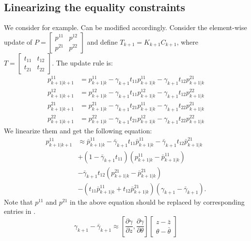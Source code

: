 \documentclass[letterpaper, 10 pt, conference]{ieeeconf}  %
\begin{document}
\subsection{Linearizing the equality constraints}
We consider  for example.  Can be modified accordingly.
Consider the element-wise update of $P=\begin{bmatrix}
p^{11} & p^{12}\\p^{21} & p^{22}
\end{bmatrix}$ and define $T_{k+1}=K_{k+1}C_{k+1}$, where $T=\begin{bmatrix}
t_{11} & t_{12}\\ t_{21} & t_{22}
\end{bmatrix}.$
The update rule is:
\begin{equation}\label{eqn:elementwise-upd-P}
\begin{split}
p^{11}_{k+1|k+1}&=p^{11}_{k+1|k}-\gamma_{k+1}t_{11}p^{11}_{k+1|k}-\gamma_{k+1}t_{12}p^{21}_{k+1|k}\\
p^{12}_{k+1|k+1}&=p^{12}_{k+1|k}-\gamma_{k+1}t_{11}p^{12}_{k+1|k}-\gamma_{k+1}t_{12}p^{22}_{k+1|k}\\
p^{21}_{k+1|k+1}&=p^{21}_{k+1|k}-\gamma_{k+1}t_{21}p^{11}_{k+1|k}-\gamma_{k+1}t_{22}p^{21}_{k+1|k}\\
p^{22}_{k+1|k+1}&=p^{22}_{k+1|k}-\gamma_{k+1}t_{21}p^{12}_{k+1|k}-\gamma_{k+1}t_{22}p^{22}_{k+1|k}
\end{split}
\end{equation}
We linearize them and get the following equation:
\begin{equation*}
\begin{split}
p^{11}_{k+1|k+1}&\approx \bar{p}^{11}_{k+1|k}-\bar{\gamma}_{k+1}t_{11}\bar{p}^{11}_{k+1|k}-\bar{\gamma}_{k+1}t_{12}\bar{p}^{21}_{k+1|k}\\
&+(1-\bar{\gamma}_{k+1}t_{11})(p^{11}_{k+1|k}-\bar{p}^{11}_{k+1|k})\\
&-\bar{\gamma}_{k+1}t_{12}(p^{21}_{k+1|k}-\bar{p}^{21}_{k+1|k})\\
&-(t_{11}\bar{p}^{11}_{k+1|k}+t_{12}\bar{p}^{21}_{k+1|k})(\gamma_{k+1}-\bar{\gamma}_{k+1}).
\end{split}
\end{equation*}
Note that $p^{11}$ and $p^{21}$ in the above equation should be replaced by corresponding entries in .
\begin{equation*}
\gamma_{k+1}-\bar{\gamma}_{k+1}\approx \left[\frac{\partial \gamma}{\partial z},\frac{\partial \gamma}{\partial \theta}\right]\begin{bmatrix}
z-\bar{z} \\ \theta-\bar{\theta}
\end{bmatrix}
\end{equation*}
\end{document}
